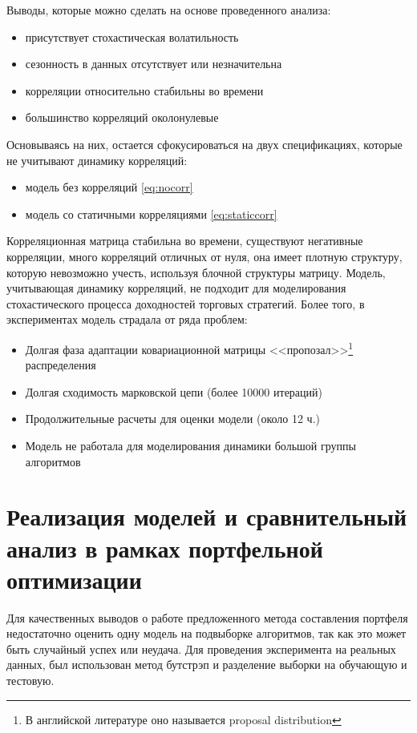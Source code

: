 Выводы, которые можно сделать на основе проведенного анализа:
\begin{itemize}
	\item присутствует стохастическая волатильность
	\item сезонность в данных отсутствует или незначительна
	\item корреляции относительно стабильны во времени
	\item большинство корреляций околонулевые
\end{itemize}

Основываясь на них, остается сфокусироваться на двух спецификациях, которые не учитывают динамику корреляций:
\begin{itemize}
	\item модель без корреляций \eqref{eq:nocorr}
	\item модель со статичными корреляциями \eqref{eq:staticcorr}
\end{itemize}

Корреляционная матрица стабильна во времени, существуют негативные корреляции, много корреляций отличных от нуля, она имеет плотную структуру, которую невозможно учесть, используя блочной структуры матрицу. Модель, учитывающая динамику корреляций, не подходит для моделирования стохастического процесса доходностей торговых стратегий. Более того, в экспериментах модель страдала от ряда проблем:
\begin{itemize}
	\item Долгая фаза адаптации ковариационной матрицы <<пропозал>>\footnote{В английской литературе оно называется proposal distribution} распределения
	\item Долгая сходимость марковской цепи (более 10000 итераций)
	\item Продолжительные расчеты для оценки модели (около 12 ч.)
	\item Модель не работала для моделирования динамики большой группы алгоритмов
\end{itemize}

\section{Реализация моделей и сравнительный анализ в рамках портфельной оптимизации}
Для качественных выводов о работе предложенного метода составления портфеля недостаточно оценить одну модель на подвыборке алгоритмов, так как это может быть случайный успех или неудача. Для проведения эксперимента на реальных данных, был использован метод бутстрэп \citep{grimshaw1995} и разделение выборки на обучающую и тестовую.

